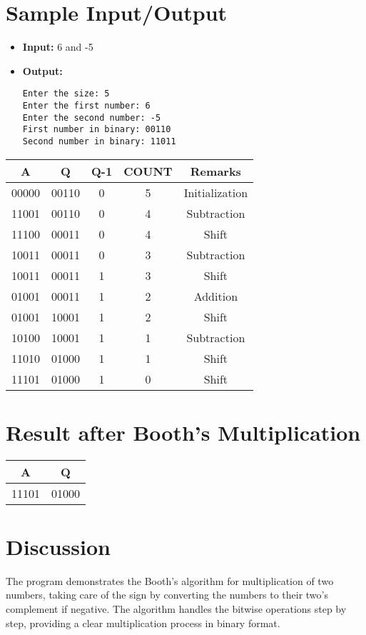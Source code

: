 \documentclass[a4paper,12pt]{article}
\begin{document}
\section*{Sample Input/Output}

\begin{itemize}
    \item \textbf{Input:} 6 and -5
    \item \textbf{Output:}
    \begin{verbatim}
Enter the size: 5
Enter the first number: 6
Enter the second number: -5
First number in binary: 00110
Second number in binary: 11011

\end{verbatim}
\end{itemize}
\begin{tabular}{|c|c|c|c|c|}
\hline
\textbf{A} & \textbf{Q} & \textbf{Q-1} & \textbf{COUNT} & \textbf{Remarks} \\
\hline
00000 & 00110 & 0 & 5 & Initialization \\
\hline
11001 & 00110 & 0 & 4 & Subtraction \\
\hline
11100 & 00011 & 0 & 4 & Shift \\
\hline
10011 & 00011 & 0 & 3 & Subtraction \\
\hline
10011 & 00011 & 1 & 3 & Shift \\
\hline
01001 & 00011 & 1 & 2 & Addition \\
\hline
01001 & 10001 & 1 & 2 & Shift \\
\hline
10100 & 10001 & 1 & 1 & Subtraction \\
\hline
11010 & 01000 & 1 & 1 & Shift \\
\hline
11101 & 01000 & 1 & 0 & Shift \\
\hline
\end{tabular}

\section*{Result after Booth's Multiplication}
\begin{tabular}{cc}
\textbf{A} & \textbf{Q} \\
\hline
11101 & 01000 \\
\end{tabular}

\section*{Discussion}
The program demonstrates the Booth's algorithm for multiplication of two numbers, taking care of the sign by converting the numbers to their two's complement if negative. The algorithm handles the bitwise operations step by step, providing a clear multiplication process in binary format.
\end{document}
